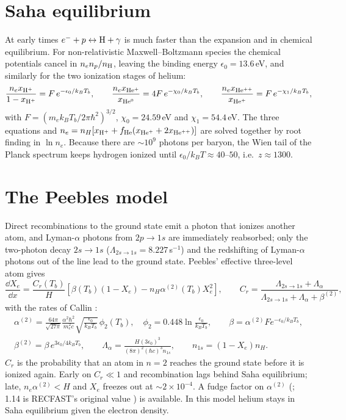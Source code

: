 \section{Saha equilibrium}

At early times $e^-+p\leftrightarrow{\rm H}+\gamma$ is much faster than the expansion and in chemical equilibrium.
For non-relativistic Maxwell--Boltzmann species the chemical potentials cancel in $n_en_p/n_{\rm H}$, leaving the
binding energy $\epsilon_0=13.6$\,eV, and similarly for the two ionization stages of helium:
\begin{equation}
\frac{n_ex_{\rm H^+}}{1-x_{\rm H^+}}=F\,e^{-\epsilon_0/k_BT_b},\qquad
\frac{n_ex_{\rm He^+}}{x_{\rm He^0}}=4F\,e^{-\chi_0/k_BT_b},\qquad
\frac{n_ex_{\rm He^{++}}}{x_{\rm He^+}}=F\,e^{-\chi_1/k_BT_b},
\label{eq:rec-saha}
\end{equation}
with $F=(m_ek_BT_b/2\pi\hbar^2)^{3/2}$, $\chi_0=24.59$\,eV and $\chi_1=54.4$\,eV. The three equations and
$n_e=n_H[x_{\rm H^+}+f_{\rm He}(x_{\rm He^+}+2x_{\rm He^{++}})]$ are solved together by root finding in $\ln n_e$.
Because there are $\sim10^9$ photons per baryon, the Wien tail of the Planck spectrum keeps hydrogen ionized until
$\epsilon_0/k_BT\approx40$--$50$, i.e.\ $z\approx1300$.

\section{The Peebles model}

Direct recombinations to the ground state emit a photon that ionizes another atom, and Lyman-$\alpha$ photons from
$2p\to1s$ are immediately reabsorbed; only the two-photon decay $2s\to1s$ ($\Lambda_{2s\to1s}=8.227$\,s$^{-1}$) and the
redshifting of Lyman-$\alpha$ photons out of the line lead to the ground state. Peebles' effective three-level atom
\cite{Peebles1968} gives
\begin{equation}
\frac{\dd X_e}{\dd x}=\frac{C_r(T_b)}{H}\left[\beta(T_b)(1-X_e)-n_H\alpha^{(2)}(T_b)X_e^2\right],\qquad
C_r=\frac{\Lambda_{2s\to1s}+\Lambda_\alpha}{\Lambda_{2s\to1s}+\Lambda_\alpha+\beta^{(2)}},
\label{eq:rec-peebles}
\end{equation}
with the rates of Callin \cite{Callin2006}:
\begin{gather}
\alpha^{(2)}=\frac{64\pi}{\sqrt{27\pi}}\frac{\alpha^2\hbar^2}{m_e^2c}\sqrt{\frac{\epsilon_0}{k_BT_b}}\,\phi_2(T_b),\quad
\phi_2=0.448\ln\frac{\epsilon_0}{k_BT_b},\qquad \beta=\alpha^{(2)}Fe^{-\epsilon_0/k_BT_b},\\
\beta^{(2)}=\beta\,e^{3\epsilon_0/4k_BT_b},\qquad
\Lambda_\alpha=\frac{H(3\epsilon_0)^3}{(8\pi)^2(\hbar c)^3n_{1s}},\qquad n_{1s}=(1-X_e)n_H .
\end{gather}
$C_r$ is the probability that an atom in $n=2$ reaches the ground state before it is ionized again. Early on
$C_r\ll1$ and recombination lags behind Saha equilibrium; late, $n_e\alpha^{(2)}<H$ and $X_e$ freezes out at
$\sim2\times10^{-4}$. A fudge factor on $\alpha^{(2)}$ (; 1.14 is RECFAST's original value
\cite{Seager1999}) is available. In this model helium stays in Saha equilibrium given the electron density.

